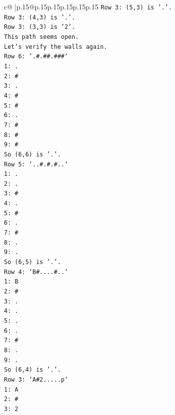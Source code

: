 \documentclass{article}
\begin{document}
{\begin{supertabular}{c@{$\;$}|p{.15\linewidth}@{}p{.15\linewidth}p{.15\linewidth}p{.15\linewidth}p{.15\linewidth}p{.15\linewidth}}
{{{\texttt{Row 3: (5,3) is '.'.} \\
\texttt{Row 3: (4,3) is '.'.} \\
\texttt{Row 3: (3,3) is '2'.} \\
\texttt{This path seems open.} \\
\texttt{Let's verify the walls again.} \\
\texttt{Row 6: `.\#.\#\#.\#\#\#`} \\
\texttt{1: .} \\
\texttt{2: \#} \\
\texttt{3: .} \\
\texttt{4: \#} \\
\texttt{5: \#} \\
\texttt{6: .} \\
\texttt{7: \#} \\
\texttt{8: \#} \\
\texttt{9: \#} \\
\texttt{So (6,6) is '.'.} \\
\texttt{Row 5: `..\#.\#.\#..`} \\
\texttt{1: .} \\
\texttt{2: .} \\
\texttt{3: \#} \\
\texttt{4: .} \\
\texttt{5: \#} \\
\texttt{6: .} \\
\texttt{7: \#} \\
\texttt{8: .} \\
\texttt{9: .} \\
\texttt{So (6,5) is '.'.} \\
\texttt{Row 4: `B\#....\#..`} \\
\texttt{1: B} \\
\texttt{2: \#} \\
\texttt{3: .} \\
\texttt{4: .} \\
\texttt{5: .} \\
\texttt{6: .} \\
\texttt{7: \#} \\
\texttt{8: .} \\
\texttt{9: .} \\
\texttt{So (6,4) is '.'.} \\
\texttt{Row 3: `A\#2.....p`} \\
\texttt{1: A} \\
\texttt{2: \#} \\
\texttt{3: 2} \\
}}}
\end{supertabular}}
\end{document}
